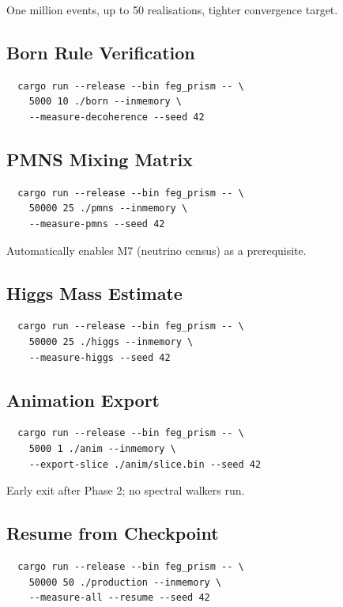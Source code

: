 \documentclass[11pt, a4paper, openany]{book}
\begin{document}
One million events, up to 50 realisations, tighter convergence target.

\subsection{Born Rule Verification}

\begin{verbatim}
  cargo run --release --bin feg_prism -- \
    5000 10 ./born --inmemory \
    --measure-decoherence --seed 42
\end{verbatim}

\subsection{PMNS Mixing Matrix}

\begin{verbatim}
  cargo run --release --bin feg_prism -- \
    50000 25 ./pmns --inmemory \
    --measure-pmns --seed 42
\end{verbatim}

Automatically enables M7 (neutrino census) as a prerequisite.

\subsection{Higgs Mass Estimate}

\begin{verbatim}
  cargo run --release --bin feg_prism -- \
    50000 25 ./higgs --inmemory \
    --measure-higgs --seed 42
\end{verbatim}

\subsection{Animation Export}

\begin{verbatim}
  cargo run --release --bin feg_prism -- \
    5000 1 ./anim --inmemory \
    --export-slice ./anim/slice.bin --seed 42
\end{verbatim}

Early exit after Phase 2; no spectral walkers run.

\subsection{Resume from Checkpoint}

\begin{verbatim}
  cargo run --release --bin feg_prism -- \
    50000 50 ./production --inmemory \
    --measure-all --resume --seed 42
\end{verbatim}
\end{document}
